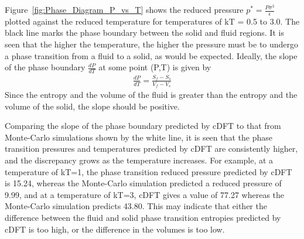 \documentclass[double,12pt]{beavtex}
\begin{document}
Figure~\ref{fig:Phase_Diagram_P_vs_T} shows the reduced pressure 
$p^*=\frac{P\sigma^3}{\epsilon}$ plotted against the reduced temperature 
for temperatures of kT = 0.5 to 3.0. 
The black line marks the phase boundary between the solid and fluid regions. 
It is seen that the higher the temperature, the higher the pressure must be
to undergo a phase transition from a fluid to a solid, as would be expected. 
Ideally, the slope of the phase boundary $\frac{dP}{dT}$ at some point (P,T) 
is given by
\begin{align} 
    \frac{dP}{dT}=\frac{S_f-S_s}{V_f-V_s}
\end{align}
Since the entropy and the volume of the fluid is greater than the entropy
and the volume of the solid, the slope should be positive. 

Comparing the slope of the phase boundary predicted by cDFT to that
from Monte-Carlo simulations shown by the white line, it is seen that
the phase transition pressures and temperatures predicted by cDFT 
are consistently higher, and the 
discrepancy grows as the temperature increases. For example, at a 
temperature of kT=1, the phase transition reduced pressure predicted by 
cDFT is 15.24, whereas the Monte-Carlo simulation predicted a reduced 
pressure of 9.99,
and at a temperature of kT=3, cDFT gives a value of 77.27 whereas the 
Monte-Carlo simulation predicts 43.80.
This may indicate that either the difference between the fluid 
and solid phase transition entropies predicted by cDFT is too high, or 
the difference in the volumes is too low. 
\end{document}
